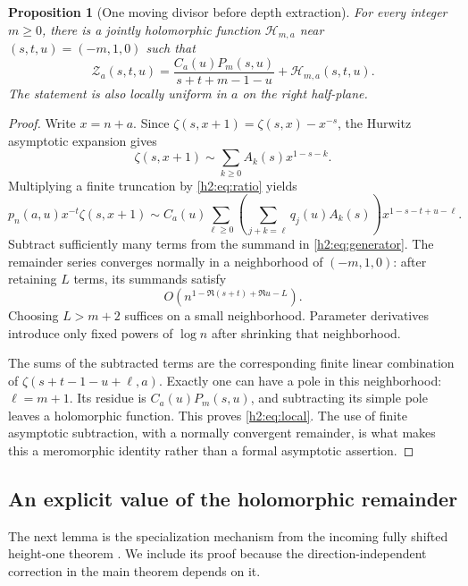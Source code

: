 \documentclass[11pt,a4paper]{article}
\newtheorem{proposition}[theorem]{Proposition}
\theoremstyle{definition}
\theoremstyle{remark}
\numberwithin{equation}{section}
\begin{document}
\begin{proposition}[One moving divisor before depth extraction]
\label{h2:prop:local}
For every integer $m\ge0$, there is a jointly holomorphic function
$\mathcal H_{m,a}$ near $(s,t,u)=(-m,1,0)$ such that
\begin{equation}\label{h2:eq:local}
 \mathcal Z_a(s,t,u)=
 \frac{C_a(u)P_m(s,u)}{s+t+m-1-u}+\mathcal H_{m,a}(s,t,u).
\end{equation}
The statement is also locally uniform in $a$ on the right half-plane.
\end{proposition}
\begin{proof}
Write $x=n+a$. Since
$\zeta(s,x+1)=\zeta(s,x)-x^{-s}$, the Hurwitz asymptotic expansion
\cite{DLMFHzeta} gives
\[
 \zeta(s,x+1)\sim\sum_{k\ge0}A_k(s)x^{1-s-k}.
\]
Multiplying a finite truncation by \eqref{h2:eq:ratio} yields
\[
 p_n(a,u)x^{-t}\zeta(s,x+1)
 \sim C_a(u)\sum_{\ell\ge0}
   \left(\sum_{j+k=\ell}q_j(u)A_k(s)\right)
                         x^{1-s-t+u-\ell}.
\]
Subtract sufficiently many terms from the summand in
\eqref{h2:eq:generator}. The remainder series converges normally in a
neighborhood of $(-m,1,0)$: after retaining $L$ terms, its
summands satisfy
\[
 O(n^{1-\Re(s+t)+\Re u-L}).
\]
Choosing $L>m+2$ suffices on a small neighborhood. Parameter derivatives introduce only fixed powers
of $\log n$ after shrinking that neighborhood.

The sums of the subtracted terms are the corresponding finite linear
combination of
$\zeta(s+t-1-u+\ell,a)$. Exactly one can have a pole in this
neighborhood: $\ell=m+1$. Its residue is
$C_a(u)P_m(s,u)$, and subtracting its simple pole leaves a holomorphic
function. This proves \eqref{h2:eq:local}. The use of finite asymptotic
subtraction, with a normally convergent remainder, is what makes this a
meromorphic identity rather than a formal asymptotic assertion.
\end{proof}

\subsection{An explicit value of the holomorphic remainder}

The next lemma is the specialization mechanism from the incoming
fully shifted height-one theorem \cite{IncomingExact}. We include its
proof because the direction-independent correction in the main theorem
depends on it.
\end{document}
